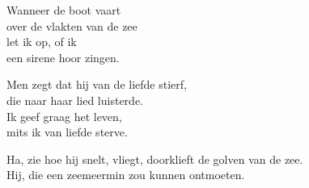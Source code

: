 \clearpage
\begin{translation}
Wanneer de boot vaart\\
over de vlakten van de zee\\
let ik op, of ik\\
een sirene hoor zingen.\vspace{\wlskip}

Men zegt dat hij van de liefde stierf,\\
die naar haar lied luisterde.\\
Ik geef graag het leven,\\
mits ik van liefde sterve.\vspace{\wlskip}

Ha, zie hoe hij snelt, vliegt, doorklieft de golven van de zee.\\
Hij, die een zeemeermin zou kunnen ontmoeten.\\
\end{translation}
